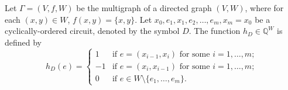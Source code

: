 Let $\Gamma = (V, f, W)$ be the multigraph of a directed graph $(V, W)$, where for each $(x, y) \in W$, $f(x, y) = \{x, y\}$. Let $x_0, e_1, x_1, e_2, \ldots, e_m, x_m = x_0$ be a cyclically-ordered circuit, denoted by the symbol $D$. The function $h_D \in \mathbb{Q}^W$ is defined by
$$
h_D(e) = \begin{cases}
1 & \text{if } e = (x_{i-1}, x_i) \text{ for some } i = 1, \ldots, m; \\
-1 & \text{if } e = (x_i, x_{i-1}) \text{ for some } i = 1, \ldots, m; \\
0 & \text{if } e \in W \setminus \{e_1, \ldots, e_m\}.
\end{cases}
$$
